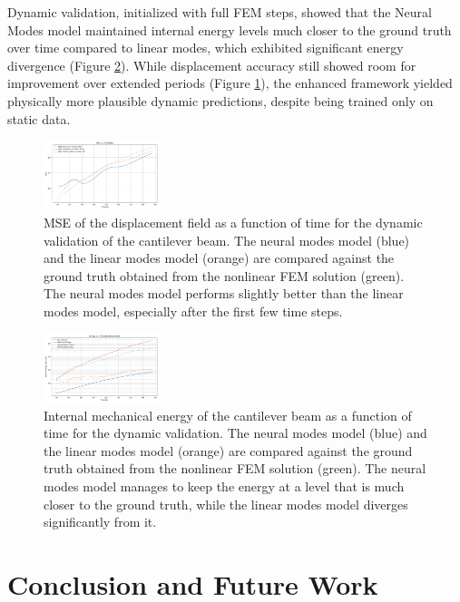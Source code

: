 \documentclass[11pt,a4paper,twocolumn]{article}
\begin{document}
Dynamic validation, initialized with full FEM steps, showed that the Neural Modes model maintained internal energy levels much closer to the ground truth over time compared to linear modes, which exhibited significant energy divergence (Figure \ref{fig:dynamic_validation_energy_comparison}). While displacement accuracy still showed room for improvement over extended periods (Figure \ref{fig:dynamic_validation_mse_comparison}), the enhanced framework yielded physically more plausible dynamic predictions, despite being trained only on static data.

\begin{figure}[H]
    \centering
    \includegraphics[width=0.3\textwidth]{Images/beam_dynamic_mse.png}
    \caption{MSE of the displacement field as a function of time for the dynamic validation of the cantilever beam. The neural modes model (blue) and the linear modes model (orange) are compared against the ground truth obtained from the nonlinear FEM solution (green). The neural modes model performs slightly better than the linear modes model, especially after the first few time steps.}
    \label{fig:dynamic_validation_mse_comparison}
    \end{figure}

\begin{figure}[htb]
    \centering
    \includegraphics[width=0.3\textwidth]{Images/beam_dynamic_energy.png}
    \caption{Internal mechanical energy of the cantilever beam as a function of time for the dynamic validation. The neural modes model (blue) and the linear modes model (orange) are compared against the ground truth obtained from the nonlinear FEM solution (green). The neural modes model manages to keep the energy at a level that is much closer to the ground truth, while the linear modes model diverges significantly from it.}
    \label{fig:dynamic_validation_energy_comparison}
    \end{figure}

\section{Conclusion and Future Work}
\label{sec:es:conclusion}
\end{document}
